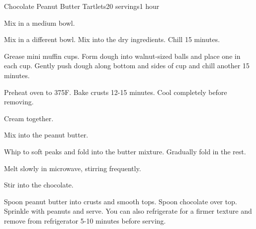 \documentclass[../Cookbook.tex]{subfiles}
\begin{document}
\begin{recipe}{Chocolate Peanut Butter Tartlets}{20 servings}{1 hour}

Mix in a medium bowl.

Mix in a different bowl. Mix into the dry ingredients. Chill 15 minutes.

Grease mini muffin cups. Form dough into walnut-sized balls and place one in each cup. Gently push dough along bottom and sides of cup and chill another 15 minutes.

Preheat oven to 375\0F. Bake crusts 12-15 minutes. Cool completely before removing.

Cream together.

Mix into the peanut butter.

Whip to soft peaks and fold  into the butter mixture. Gradually fold in the rest.

Melt slowly in microwave, stirring frequently.

Stir into the chocolate.

Spoon peanut butter into crusts and smooth tops. Spoon chocolate over top. Sprinkle with peanuts and serve.
You can also refrigerate for a firmer texture and remove from refrigerator 5-10 minutes before serving.

\end{recipe}
\end{document}
